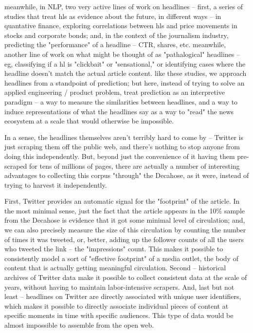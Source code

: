 \documentclass{scrartcl}
\begin{document}
meanwhile, in NLP, two very active lines of work on headlines -- first, a series of studies that treat hls as evidence about the future, in different ways -- in quantative finance, exploring correlations between hls and price movements in stocks and corporate bonds; and, in the context of the journalism industry, predicting the "performance" of a headline -- CTR, shares, etc. meanwhile, another line of work on what might be thought of as "pathalogical" headlines -- eg, classifying if a hl is "clickbait" or "sensational," or identifying cases where the headline doesn't match the actual article content.
like these studies, we approach headlines from a standpoint of prediction; but here, instead of trying to solve an applied engineering / product problem, treat prediction as an interpretive paradigm -- a way to measure the similarities between headlines, and a way to induce representations of what the headlines say as a way to "read" the news ecosystem at a scale that would otherwise be impossible.





In a sense, the headlines themselves aren't terribly hard to come by -- Twitter is just scraping them off the public web, and there's nothing to stop anyone from doing this independently. But, beyond just the convenience of it having them pre-scraped for tens of millions of pages, there are actually a number of interesting advantages to collecting this corpus "through" the Decahose, as it were, instead of trying to harvest it independently.

First, Twitter provides an automatic signal for the "footprint" of the article. In the most minimal sense, just the fact that the article appears in the 10\% sample from the Decahose is evidence that it got some minimal level of circulation; and, we can also precisely measure the size of this circulation by counting the number of times it was tweeted, or, better, adding up the follower counts of all the users who tweeted the link -- the "impressions" count. This makes it possible to consistently model a sort of "effective footprint" of a media outlet, the body of content that is actually getting meaningful circulation. Second -- historical archives of Twitter data make it possible to collect consistent data at the scale of years, without having to maintain labor-intensive scrapers. And, last but not least -- headlines on Twitter are directly associated with unique user identifiers, which makes it possible to directly associate individual pieces of content at specific moments in time with specific audiences. This type of data would be almost impossible to assemble from the open web.
\end{document}
